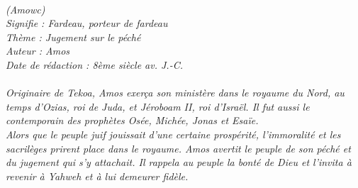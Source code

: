 \BFont
\noindent\hrulefill
{\footnotesize
\textit{
\bigskip
{\centering{}
\\(Amowc)
\\Signifie : Fardeau, porteur de fardeau
\\Thème : Jugement sur le péché
\\Auteur : Amos
\\Date de rédaction : 8ème siècle av. J.-C.\\}
}
\textit{
\\Originaire de Tekoa, Amos exerça son ministère dans le royaume du Nord, au temps d’Ozias, roi de Juda, et Jéroboam II, roi d’Israël. Il fut aussi le contemporain des prophètes Osée, Michée, Jonas et Esaïe.
\\Alors que le peuple juif jouissait d’une certaine prospérité, l’immoralité et les sacrilèges prirent place dans le royaume. Amos avertit le peuple de son péché et du jugement qui s’y attachait. Il rappela au peuple la bonté de Dieu et l’invita à revenir à Yahweh et à lui demeurer fidèle.\bigskip
}
}
\par\nobreak\noindent\hrulefill

